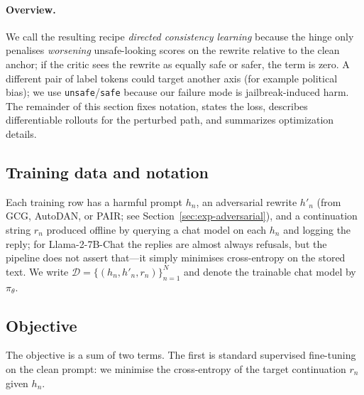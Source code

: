 \documentclass{article}
\begin{document}
\paragraph{Overview.}
We call the resulting recipe \emph{directed consistency learning} because the hinge only penalises \emph{worsening} unsafe-looking scores on the rewrite relative to the clean anchor; if the critic sees the rewrite as equally safe or safer, the term is zero. A different pair of label tokens could target another axis (for example political bias); we use \texttt{unsafe}/\texttt{safe} because our failure mode is jailbreak-induced harm. The remainder of this section fixes notation, states the loss, describes differentiable rollouts for the perturbed path, and summarizes optimization details.

\subsection{Training data and notation}
Each training row has a harmful prompt $h_n$, an adversarial rewrite $h'_n$ (from GCG, AutoDAN, or PAIR; see Section~\ref{sec:exp-adversarial}), and a continuation string $r_n$ produced offline by querying a chat model on each $h_n$ and logging the reply; for Llama-2-7B-Chat the replies are almost always refusals, but the pipeline does not assert that---it simply minimises cross-entropy on the stored text. We write $\mathcal{D}=\{(h_n,h'_n,r_n)\}_{n=1}^{N}$ and denote the trainable chat model by $\pi_\theta$.

\subsection{Objective}
The objective is a sum of two terms. The first is standard supervised fine-tuning on the clean prompt: we minimise the cross-entropy of the target continuation $r_n$ given $h_n$. 
\end{document}
